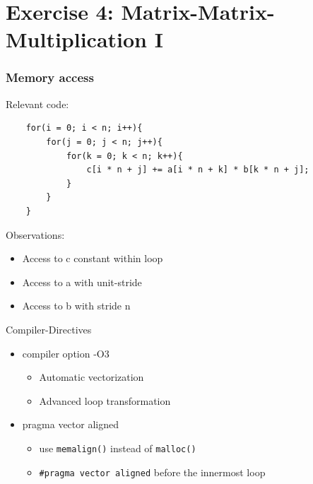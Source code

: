 \section{Exercise 4: Matrix-Matrix-Multiplication I}
\begin{frame}[fragile]
\frametitle{Memory access}
Relevant code:
\codestylec
\begin{lstlisting}
    for(i = 0; i < n; i++){
        for(j = 0; j < n; j++){
            for(k = 0; k < n; k++){
                c[i * n + j] += a[i * n + k] * b[k * n + j];
            }
        }
    }
\end{lstlisting}
Observations:
\begin{itemize}
\item Access to c constant within loop
\item Access to a with unit-stride
\item Access to b with stride n
\end{itemize}

\end{frame}

\begin{frame}{Compiler-Directives}
\begin{itemize}
\item compiler option -O3
	\begin{itemize}
	\item Automatic vectorization
	\item Advanced loop transformation 
	\end{itemize}
\item pragma vector aligned
	\begin{itemize}
	\item use \texttt{memalign()} instead of \texttt{malloc()}
	\item \texttt{\#pragma vector aligned} before the innermost loop
	\end{itemize}
\end{itemize}
\end{frame}

